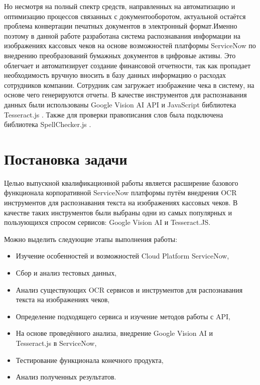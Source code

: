 \documentclass[14pt]{mmcs_article}
\begin{document}
Но несмотря на полный спектр средств, направленных на автоматизацию и оптимизацию процессов связанных с документооборотом, актуальной остаётся проблема конвертации печатных документов в электронный формат.Именно поэтому в данной работе разработана система распознавания информации на изображениях кассовых чеков на основе возможностей платформы Service\-Now по внедрению преобразований бумажных документов в цифровые активы. Это облегчает и автоматизирует создание финансовой отчетности, так как пропадает необходимость вручную вносить в базу данных информацию о расходах сотрудников компании. Сотрудник сам загружает изображение чека в систему, на основе чего генерируются отчеты.
В качестве инструментов для распознавания данных были использованы  Google Vision AI API \cite{stud:b02} и JavaScript библиотека Tesseract.js \cite{stud:b01}.  Также для проверки правописания слов была подключена библиотека SpellChecker.js \cite{stud:b012}.


\newpage
{}
\section*{Постановка задачи}
Целью выпускной квалификационной работы является расширение базового функционала корпоративной ServiceNow платформы путём внедрения OCR инструментов для распознавания текста на изображениях кассовых чеков. В качестве таких инструментов были выбраны одни из самых популярных и пользующихся спросом сервисов:  Google Vision AI и Tesseract.JS. 

Можно выделить следующие этапы выполнения работы:
\begin{itemize}
\item Изучение особенностей и возможностей Cloud Platform ServiceNow,
\item Сбор и анализ тестовых данных,
\item Анализ существующих OCR сервисов и инструментов для распознавания текста на изображениях чеков,
\item Определение подходящего сервиса и изучение методов работы с API,
\item На основе проведённого анализа, внедрение Google Vision AI и \\Tesseract.js в ServiceNow,
\item Тестирование функционала конечного продукта,
\item Анализ полученных результатов.
\end{itemize}
\end{document}

